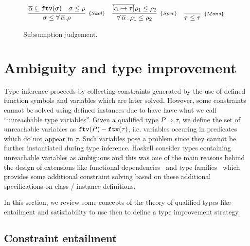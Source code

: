 \documentclass[a4paper, 11pt]{article}
\begin{document}
\begin{figure}[H]
\[
  \begin{array}{ccc} 
    \infer[_{\{Skol\}}] 
          {\sigma \leq \forall\,\overline{\alpha}.\rho}
          {\overline{\alpha}\subseteq \ftv(\sigma) & 
            \sigma \leq \rho}
    & 
    \infer[_{\{Spec\}}]
          {\forall\,\overline{\alpha}\,.\,\rho_1 \leq \rho_2} 
          {\overline{[\alpha\mapsto\tau]}\rho_1 \leq \rho_2}
    & 
    \infer[_{\{Mono\}}] 
          {\tau \leq \tau}
          {}
  \end{array}
\]
  \centering 
  \caption{Subsumption judgement.}
  \label{fig:subsumption}
\end{figure}





\section{Ambiguity and type improvement}

Type inference proceeds by collecting constraints generated 
by the use of defined function symbols and variables which 
are later solved. However, some constraints cannot be solved 
using defined instances due to have have what we call 
``unreachable type variables''. Given a qualified type 
$P \Rightarrow \tau$, we define the set of unreachable variables 
as $\mathtt{ftv}(P) - \mathtt{ftv}(\tau)$, i.e. variables occuring in predicates 
which do not appear in $\tau$. Such variables pose a problem 
since they cannot be further instantiated during type inference.
Haskell consider types containing unreachable variables as 
ambiguous and this was one of the main reasons behind the 
design of extensions like functional dependencies~\cite{Jones2000}
and type families~\cite{Chakravarty2005} which provides some additional 
constraint solving based on these additional specifications on 
class / instance definitions.

In this section, we review some concepts of the theory of 
qualified types like entailment and satisfiability to use then 
to define a type improvement strategy.

\subsection{Constraint entailment} 
\end{document}
